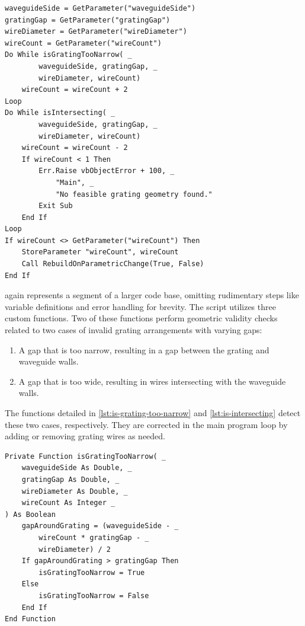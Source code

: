\documentclass[11pt,a4paper,twoside,openany]{report}
\begin{document}
\begin{lstlisting}[caption={Grating adjustment script}, label={lst:grating-adjustment}, language=VBScript]
waveguideSide = GetParameter("waveguideSide")
gratingGap = GetParameter("gratingGap")
wireDiameter = GetParameter("wireDiameter")
wireCount = GetParameter("wireCount")
Do While isGratingTooNarrow( _
        waveguideSide, gratingGap, _
        wireDiameter, wireCount)
    wireCount = wireCount + 2
Loop
Do While isIntersecting( _
        waveguideSide, gratingGap, _
        wireDiameter, wireCount)
    wireCount = wireCount - 2
    If wireCount < 1 Then
        Err.Raise vbObjectError + 100, _
            "Main", _
            "No feasible grating geometry found."
        Exit Sub
    End If
Loop
If wireCount <> GetParameter("wireCount") Then
    StoreParameter "wireCount", wireCount
    Call RebuildOnParametricChange(True, False)
End If
\end{lstlisting}

 again represents a segment of a larger code base, omitting rudimentary steps like variable definitions and error handling for brevity. The script utilizes three custom functions. Two of these functions perform geometric validity checks related to two cases of invalid grating arrangements with varying gaps:
\begin{enumerate}[label=(\alph*)]
    \item A gap that is too narrow, resulting in a gap between the grating and waveguide walls.
    \item A gap that is too wide, resulting in wires intersecting with the waveguide walls.
\end{enumerate}
The functions detailed in \cref{lst:is-grating-too-narrow} and \cref{lst:is-intersecting} detect these two cases, respectively. They are corrected in the main program loop by adding or removing grating wires as needed.

\begin{lstlisting}[caption={Check for a gap around the grating}, label={lst:is-grating-too-narrow}, language=VBScript]
Private Function isGratingTooNarrow( _
    waveguideSide As Double, _
    gratingGap As Double, _
    wireDiameter As Double, _
    wireCount As Integer _
) As Boolean
    gapAroundGrating = (waveguideSide - _
        wireCount * gratingGap - _
        wireDiameter) / 2
    If gapAroundGrating > gratingGap Then
        isGratingTooNarrow = True
    Else
        isGratingTooNarrow = False
    End If
End Function
\end{lstlisting}
\end{document}
